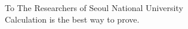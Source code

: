 \begin{dedication}
{\large{To The Researchers of Seoul National University}}\\[5mm]
Calculation is the best way to prove.
\end{dedication}

